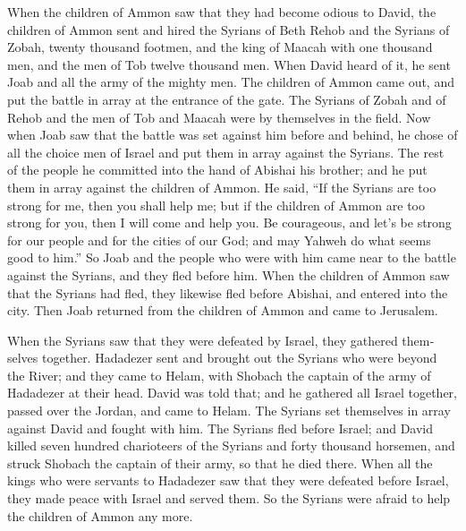 \begin{paracol}{2}
\begin{otherlanguage}{english}
 When the children of Ammon saw that they had become
odious to David, the children of Ammon sent and hired the Syrians of
Beth Rehob and the Syrians of Zobah, twenty thousand footmen, and the
king of Maacah with one thousand men, and the men of Tob twelve thousand
men.  When David heard of it, he sent Joab and all the
army of the mighty men.  The children of Ammon came out,
and put the battle in array at the entrance of the gate. The Syrians of
Zobah and of Rehob and the men of Tob and Maacah were by themselves in
the field.  Now when Joab saw that the battle was set
against him before and behind, he chose of all the choice men of Israel
and put them in array against the Syrians.  The rest of
the people he committed into the hand of Abishai his brother; and he put
them in array against the children of Ammon.  He said,
``If the Syrians are too strong for me, then you shall help me; but if
the children of Ammon are too strong for you, then I will come and help
you.  Be courageous, and let's be strong for our people
and for the cities of our God; and may Yahweh do what seems good to
him.''  So Joab and the people who were with him came
near to the battle against the Syrians, and they fled before him.
 When the children of Ammon saw that the Syrians had
fled, they likewise fled before Abishai, and entered into the city. Then
Joab returned from the children of Ammon and came to Jerusalem.

 When the Syrians saw that they were defeated by Israel,
they gathered themselves together.  Hadadezer sent and
brought out the Syrians who were beyond the River; and they came to
Helam, with Shobach the captain of the army of Hadadezer at their head.
 David was told that; and he gathered all Israel
together, passed over the Jordan, and came to Helam. The Syrians set
themselves in array against David and fought with him. 
The Syrians fled before Israel; and David killed seven hundred
charioteers of the Syrians and forty thousand horsemen, and struck
Shobach the captain of their army, so that he died there.
 When all the kings who were servants to Hadadezer saw
that they were defeated before Israel, they made peace with Israel and
served them. So the Syrians were afraid to help the children of Ammon
any more.

\end{otherlanguage}


\end{paracol}

